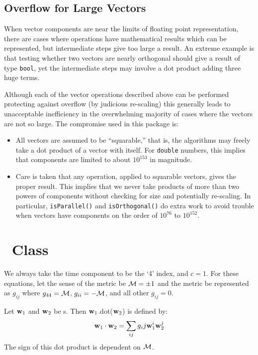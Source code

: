 \subsection{Overflow for Large Vectors}

When vector components are near the limits of floating point representation,
there are cases where operations have mathematical results which can be
represented, but intermediate steps give too large a result.  An extreme
example is that testing whether two vectors are nearly orthogonal should give
a result of type \verb$bool$, yet the intermediate steps may involve a dot
product adding three huge terms.

\noindent
Although each of the vector operations described above can be performed
protecting against overflow (by judicious re-scaling) this generally leads
to unacceptable inefficiency in the overwhelming majority of cases where the
vectors are not so large.  The compromise used in this package is:

\begin{itemize}
\item All vectors are assumed to be ``squarable,'' that is, the algorithms
may freely take a dot product of a vector with itself.  For \verb$double$
numbers, this implies that components are limited to about $10^{153}$
in magnitude.
\item Care is taken that any operation, applied to squarable vectors, gives
the proper result.  This implies that we never take products of more than two
powers of components without checking for size and potentially re-scaling.
In particular, {\tt isParallel()} and {\tt isOrthogonal()} do extra work 
to avoid trouble when vectors have components on the order of $10^{76}$ to
$10^{152}$. 
\end{itemize}

\section{\protect\LV\ Class}

We always take the time component to be the `4' index, and $c = 1$.
For these equations, let the sense of the metric be $ {\cal M} = \pm 1$ and
the metric be represented as $g_{ij}$ where $g_{44} = {\cal M}$,
$g_{ii} = -{\cal M}$, and all other $g_{ij} = 0$.

\noindent
Let ${\bf w}_{1}$ and ${\bf w}_{2}$ be \LV s.
Then ${\bf w}_{1}$.dot(${\bf w}_{2}$) is defined by:
\begin{equation}
\label{eq:wdot}
  {\bf w}_{1} \cdot {\bf w}_{2} = \sum_{ij} g{_ij}
{\bf w}_{1}^{i} {\bf w}_{2}^{j} \\
\end{equation}
\noindent
The sign of this dot product is dependent on $\cal M$.

